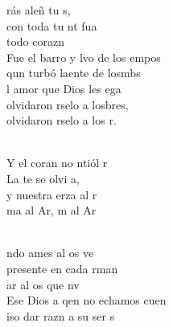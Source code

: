 \documentclass[12pt]{article}
\begin{document}
\begin{multicols*}{2}
\begin{cancion}%
	rás aleñ tu s, \\
	con toda tu nt fua\\
	 todo  corazn   \\
	Fue el barro y lvo de los empos\\
	qun turbó laente de losmbs \\
	l amor que Dios les ega \\
	olvidaron rselo a losbres,\\
	olvidaron rselo a los r. \\\jump\\
	\begin{chorus}%
	Y el coran no ntiól r \\
	La te se olvi a,\\
	y nuestra erza al r\\
	ma al Ar, m al Ar  \\
	\end{chorus}%
	\jump\\
	ndo ames al os  ve\\
	presente en cada rman \\
	ar al os que nv   \\
	Ese Dios a qen no echamos cuen\\
	iso dar razn a su ser s\\

\end{cancion}
\end{multicols*}
\end{document}
